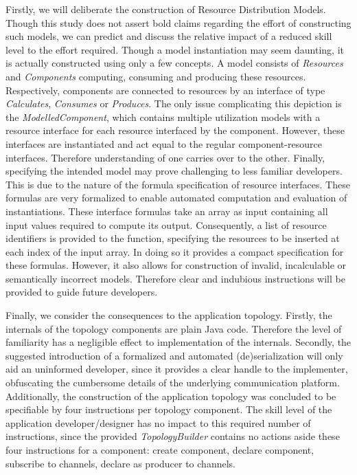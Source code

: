 Firstly, we will deliberate the construction of Resource Distribution Models. Though this study does not assert bold claims regarding the effort of constructing such models, we can predict and discuss the relative impact of a reduced skill level to the effort required. Though a model instantiation may seem daunting, it is actually constructed using only a few concepts. A model consists of \emph{Resources} and \emph{Components} computing, consuming and producing these resources. Respectively, components are connected to resources by an interface of type \emph{Calculates}, \emph{Consumes} or \emph{Produces}. The only issue complicating this depiction is the \emph{ModelledComponent}, which contains multiple utilization models with a resource interface for each resource interfaced by the component. However, these interfaces are instantiated and act equal to the regular component-resource interfaces. Therefore understanding of one carries over to the other. Finally, specifying the intended model may prove challenging to less familiar developers. This is due to the nature of the formula specification of resource interfaces. These formulas are very formalized to enable automated computation and evaluation of instantiations. These interface formulas take an array as input containing all input values required to compute its output. Consequently, a list of resource identifiers is provided to the function, specifying the resources to be inserted at each index of the input array. In doing so it provides a compact specification for these formulas. However, it also allows for construction of invalid, incalculable or semantically incorrect models. Therefore clear and indubious instructions will be provided to guide future developers.

Finally, we consider the consequences to the application topology. Firstly, the internals of the topology components are plain Java code. Therefore the level of familiarity has a negligible effect to implementation of the internals. Secondly, the suggested introduction of a formalized and automated (de)serialization will only aid an uninformed developer, since it provides a clear handle to the implementer, obfuscating the cumbersome details of the underlying communication platform. Additionally, the construction of the application topology was concluded to be specifiable by four instructions per topology component. The skill level of the application developer/designer has no impact to this required number of instructions, since the provided \emph{TopologyBuilder} contains no actions aside these four instructions for a component: create component, declare component, subscribe to channels, declare as producer to channels. 

